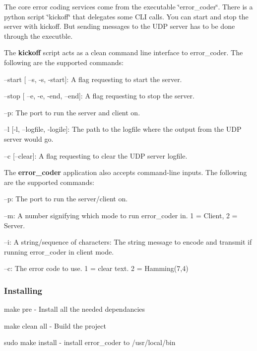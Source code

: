The core error coding services come from the executable \char`\"{}error\+\_\+coder\char`\"{}. There is a python script \char`\"{}kickoff\char`\"{} that delegates some C\+LI calls. You can start and stop the server with kickoff. But sending messages to the U\+DP server has to be done through the executble.

The {\bfseries kickoff} script acts as a clean command line interface to error\+\_\+coder. The following are the supported commands\+:


\begin{DoxyItemize}
\item --start [ --s, -\/s, -\/start]\+: A flag requesting to start the server.
\item --stop [ --e, -\/e, -\/end, --end]\+: A flag requesting to stop the server.
\item --p\+: The port to run the server and client on.
\item --l [-\/l, --logfile, -\/logile]\+: The path to the logfile where the output from the U\+DP server would go.
\item --c [--clear]\+: A flag requesting to clear the U\+DP server logfile.
\end{DoxyItemize}

The {\bfseries error\+\_\+coder} application also accepts command-\/line inputs. The following are the supported commands\+:


\begin{DoxyItemize}
\item --p\+: The port to run the server/client on.
\item --m\+: A number signifying which mode to run error\+\_\+coder in. 1 = Client, 2 = Server.
\item --i\+: A string/sequence of characters\+: The string message to encode and transmit if running error\+\_\+coder in client mode.
\item --c\+: The error code to use. 1 = clear text. 2 = Hamming(7,4)
\end{DoxyItemize}

\subsubsection*{Installing}

make pre -\/ Install all the needed dependancies

make clean all -\/ Build the project

sudo make install -\/ install error\+\_\+coder to /usr/local/bin

